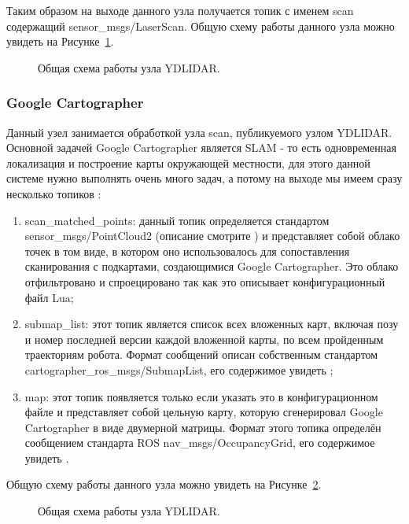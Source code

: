 Таким образом на выходе данного узла получается топик с именем scan содержащий sensor\_msgs/LaserScan. Общую схему работы данного узла можно увидеть на Рисунке~\ref{fig:node-ydlidar}.

\begin{figure}[ht]
  \caption{Общая схема работы узла YDLIDAR.}\label{fig:node-ydlidar}
\end{figure}

\subsubsection{Google Cartographer}
Данный узел занимается обработкой узла scan, публикуемого узлом YDLIDAR. Основной задачей Google Cartographer является SLAM - то есть одновременная локализация и построение карты окружающей местности, для этого данной системе нужно выполнять очень много задач, а потому на выходе мы имеем сразу несколько топиков :
\begin{enumerate}
\item scan\_matched\_points: данный топик определяется стандартом sensor\_msgs/PointCloud2 (описание смотрите ) и представляет собой облако точек в том виде, в котором оно использовалось для сопоставления сканирования с подкартами, создающимися Google Cartographer. Это облако отфильтровано и спроецировано так как это описывает конфигурационный файл Lua;
\item submap\_list: этот топик является список всех вложенных карт, включая позу и номер последней версии каждой вложенной карты, по всем пройденным траекториям робота. Формат сообщений описан собственным стандартом cartographer\_ros\_msgs/SubmapList, его содержимое увидеть ;
\item map: этот топик появляется только если указать это в конфигурационном файле и представляет собой цельную карту, которую сгенерировал Google Cartographer в виде двумерной матрицы. Формат этого топика определён сообщением стандарта ROS nav\_msgs/OccupancyGrid, его содержимое увидеть .
\end{enumerate}

Общую схему работы данного узла можно увидеть на Рисунке~\ref{fig:node-cartographer}.

\begin{figure}[ht]
  \caption{Общая схема работы узла YDLIDAR.}\label{fig:node-cartographer}
\end{figure}

